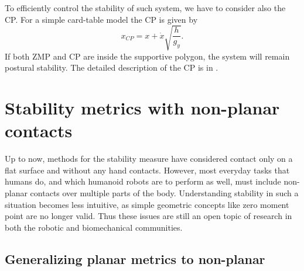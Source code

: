 \documentclass[12pt,a4paper,twoside]{article}
\begin{document}
To efficiently control the stability of such system, we have to consider also the CP. For a simple card-table model the CP is given by
\begin{equation}
x_{CP} = x + \dot{x} \sqrt{\frac{h}{g_y}}. 
\end{equation}
If both ZMP and CP are inside the supportive polygon, the system will remain postural stability. The detailed description of the CP is in \cite{Pratt2006,Koolen2012}. 

\section{Stability metrics with non-planar contacts}

Up to now,  methods for the stability measure have considered contact only on a flat surface and without any hand contacts. However, most everyday tasks that humans do, and which humanoid robots are to perform as well, must include non-planar contacts over multiple parts of the body. Understanding stability in such a situation becomes less intuitive, as simple geometric concepts like zero moment point are no longer valid.  Thus these issues are still an open topic of research in both the robotic and biomechanical communities. 

\subsection{Generalizing planar metrics to non-planar}
\end{document}
